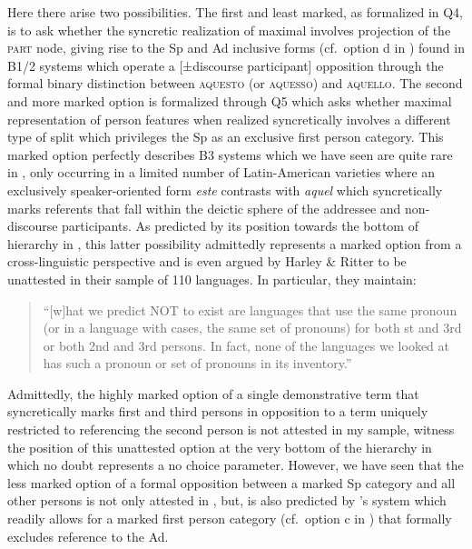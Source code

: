 \documentclass[output=paper]{langsci/langscibook}
\begin{document}
Here there arise two possibilities. The first and least marked, as formalized
in Q4, is to ask whether the syncretic realization of maximal 
involves projection of the \textsc{part} node, giving rise to the Sp and Ad
inclusive forms (cf.\ option d in ) found in
B1/2 systems which operate a [±discourse participant]
opposition through the formal binary distinction between \textsc{aquesto} (or
\textsc{aquesso}) and \textsc{aquello}. The second and more marked option is
formalized through Q5 which asks whether maximal representation of person
features when realized syncretically involves a different type of split which
privileges the Sp as an exclusive first person category. This marked option
perfectly describes B3 systems which we have seen are quite rare in ,
only occurring in a limited number of Latin-American  varieties where an
exclusively speaker-oriented form \emph{este} contrasts with \emph{aquel} which
syncretically marks referents that fall within the deictic sphere of the
addressee and non-discourse participants. As predicted by its position towards
the bottom of hierarchy in , this latter possibility
admittedly represents a marked option from a cross-linguistic perspective and
is even argued by Harley \& Ritter to be unattested in their sample of 110
languages. In particular, they maintain:

\begin{quotation}
    \enquote{[w]hat we predict NOT to exist are languages that use the same pronoun (or
    in a language with cases, the same set of pronouns) for both \First{}st and
    3rd or both 2nd and 3rd persons.  In fact, none of the languages we looked
    at has such a pronoun or set of pronouns in its
    inventory.} \parencite[513]{HarRit2002}
\end{quotation}

Admittedly, the highly marked option of a single demonstrative term that
syncretically marks first and third persons in opposition to a term uniquely
restricted to referencing the second person is not attested in my 
sample, witness the position of this unattested option at the very bottom of
the hierarchy in  which no doubt represents a no choice
parameter. However, we have seen that the less marked option of a formal
opposition between a marked Sp category and all other persons is not only
attested in , but, is also predicted by \citeauthor{HarRit2002}'s system
which readily allows for a marked first person category (cf.\ option c in
) that formally excludes reference to the Ad.
\end{document}
